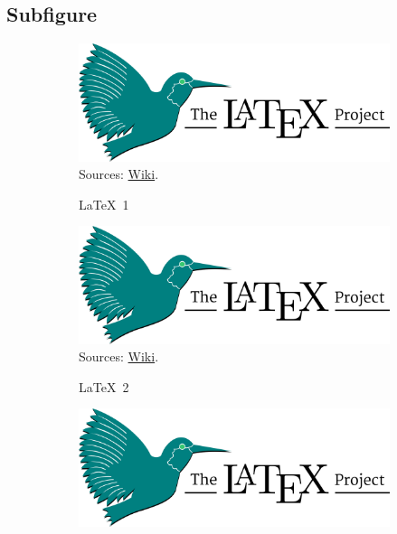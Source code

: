 \documentclass[utf8,12pt]{article} %
\begin{document}
\subsection{Subfigure}
%
%
\begin{figure}[htbp]
	\centering 
	\begin{subfigure}[b]{0.45\textwidth} %
		\centering 
		\includegraphics[width=\textwidth]{Fig/LaTeX}\\
		\footnotesize{Sources: 
		\href{https://en.wikipedia.org/wiki/LaTeX}{Wiki}.}
		\caption{\LaTeX~1} 
		\label{LaTeX 1} %
	\end{subfigure}
	\hfill
	\begin{subfigure}[b]{0.45\textwidth}
		\centering
		\includegraphics[width=\textwidth]{Fig/LaTeX}
		\footnotesize{Sources: 
		\href{https://en.wikipedia.org/wiki/LaTeX}{Wiki}.}
		\caption{\LaTeX~2} 
		\label{LaTeX 2} %
	\end{subfigure}
	\par
	\begin{subfigure}[b]{0.45\textwidth} %
		\centering 
		\includegraphics[width=\textwidth]{Fig/LaTeX}\\

\end{subfigure}
\end{figure}
\end{document}
